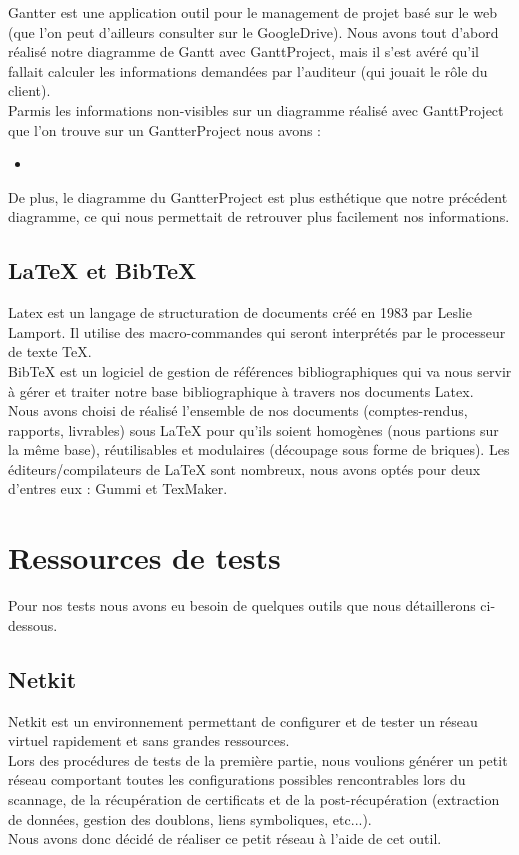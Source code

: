 Gantter \cite{gantter} est une application outil pour le management de projet basé sur le web (que l'on peut d'ailleurs consulter sur le GoogleDrive).
Nous avons tout d'abord réalisé notre diagramme de Gantt avec GanttProject, mais il s'est avéré qu'il fallait calculer les informations demandées par l'auditeur (qui jouait le rôle du client).\\
Parmis les informations non-visibles sur un diagramme réalisé avec GanttProject que l'on trouve sur un GantterProject nous avons :
\begin{itemize}
\item
\end{itemize}

De plus, le diagramme du GantterProject est plus esthétique que notre précédent diagramme, ce qui nous permettait de retrouver plus facilement nos informations.

\subsection{LaTeX et BibTeX}

Latex est un langage de structuration de documents créé en 1983 par Leslie Lamport. Il utilise des macro-commandes qui seront interprétés par le processeur de texte TeX.\\
BibTeX est un logiciel de gestion de références bibliographiques qui va nous servir à gérer et traiter notre base bibliographique à travers nos documents Latex.\\

Nous avons choisi de réalisé l'ensemble de nos documents (comptes-rendus, rapports, livrables) sous LaTeX pour qu'ils soient homogènes (nous partions sur la même base), réutilisables et modulaires (découpage sous forme de briques). Les éditeurs/compilateurs de LaTeX sont nombreux, nous avons optés pour deux d'entres eux : Gummi et TexMaker.

\section{Ressources de tests}

Pour nos tests nous avons eu besoin de quelques outils que nous détaillerons ci-dessous.

\subsection{Netkit}

Netkit est un environnement permettant de configurer et de tester un réseau virtuel rapidement et sans grandes ressources.\\
Lors des procédures de tests de la première partie, nous voulions générer un petit réseau comportant toutes les configurations possibles rencontrables lors du scannage, de la récupération de certificats et de la post-récupération (extraction de données, gestion des doublons, liens symboliques, etc...).\\
Nous avons donc décidé de réaliser ce petit réseau à l'aide de cet outil.

